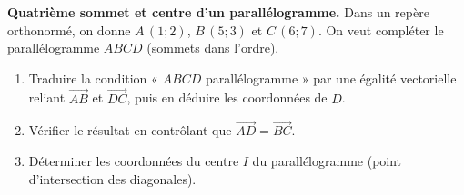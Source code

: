 \documentclass[11pt,a4paper]{article}
\newcommand{\vc}[1]{\overrightarrow{#1}}
\newcommand{\exo}[1]{\medskip\noindent{\color{primary}\bfseries\large Exercice #1.}\par\nopagebreak\smallskip}
\begin{document}
\exo{3} \textbf{Quatrième sommet et centre d'un parallélogramme.}
Dans un repère orthonormé, on donne $A\,(1;2)$, $B\,(5;3)$ et $C\,(6;7)$. On veut compléter le
parallélogramme $ABCD$ (sommets dans l'ordre).
\begin{enumerate}[label=\textbf{\alph*)},leftmargin=2em,itemsep=3pt]
  \item Traduire la condition « $ABCD$ parallélogramme » par une égalité vectorielle reliant $\vc{AB}$
        et $\vc{DC}$, puis en déduire les coordonnées de $D$.
  \item Vérifier le résultat en contrôlant que $\vc{AD}=\vc{BC}$.
  \item Déterminer les coordonnées du centre $I$ du parallélogramme (point d'intersection des
        diagonales).
\end{enumerate}
\end{document}

